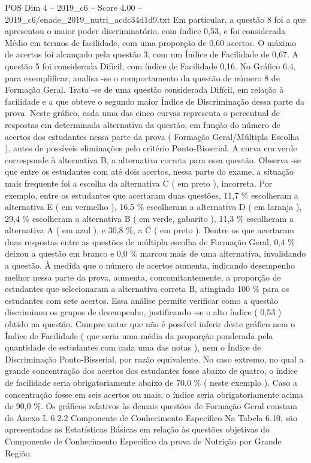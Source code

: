 \begin{textsample}{POS Dim 4 – 2019\_c6 – Score 4.00 – 2019\_c6/enade\_2019\_nutri\_acdc34d1d9.txt}
Em particular, a questão 8 foi a que apresentou o maior poder discriminatório, com índice 0,53, e foi considerada Médio em termos de facilidade, com uma proporção de 0,60 acertos.
O máximo de acertos foi alcançado pela questão 3, com um Índice de Facilidade de 0,67.
A questão 5 foi considerada Difícil, com índice de Facilidade 0,16.
No Gráfico 6.4, para exemplificar, analisa -se o comportamento da questão de número 8 de Formação Geral.
Trata -se de uma questão considerada Difícil, em relação à facilidade e a que obteve o segundo maior Índice de Discriminação dessa parte da prova.
Neste gráfico, cada uma das cinco curvas representa o percentual de respostas em determinada alternativa da questão, em função do número de acertos dos estudantes nessa parte da prova ( Formação Geral/Múltipla Escolha ), antes de possíveis eliminações pelo critério Ponto-Bisserial.
A curva em verde corresponde à alternativa B, a alternativa correta para essa questão.
Observa -se que entre os estudantes com até dois acertos, nessa parte do exame, a situação mais frequente foi a escolha da alternativa C ( em preto ), incorreta.
Por exemplo, entre os estudantes que acertaram duas questões, 11,7 \% escolheram a alternativa E ( em vermelho ), 16,5 \% escolheram a alternativa D ( em laranja ), 29,4 \% escolheram a alternativa B ( em verde, gabarito ), 11,3 \% escolheram a alternativa A ( em azul ), e 30,8 \%, a C ( em preto ).
Dentre os que acertaram duas respostas entre as questões de múltipla escolha de Formação Geral, 0,4 \% deixou a questão em branco e 0,0 \% marcou mais de uma alternativa, invalidando a questão.
À medida que o número de acertos aumenta, indicando desempenho melhor nessa parte da prova, aumenta, concomitantemente, a proporção de estudantes que selecionaram a alternativa correta B, atingindo 100 \% para os estudantes com sete acertos.
Essa análise permite verificar como a questão discriminou os grupos de desempenho, justificando -se o alto índice ( 0,53 ) obtido na questão.
Cumpre notar que não é possível inferir deste gráfico nem o Índice de Facilidade ( que seria uma média da proporção ponderada pela quantidade de estudantes com cada uma das notas ), nem o Índice de Discriminação Ponto-Bisserial, por razão equivalente.
No caso extremo, no qual a grande concentração dos acertos dos estudantes fosse abaixo de quatro, o índice de facilidade seria obrigatoriamente abaixo de 70,0 \% ( neste exemplo ).
Caso a concentração fosse em seis acertos ou mais, o índice seria obrigatoriamente acima de 90,0 \%.
Os gráficos relativos às demais questões de Formação Geral constam do Anexo I. 6.2.2 Componente de Conhecimento Específico Na Tabela 6.10, são apresentadas as Estatísticas Básicas em relação às questões objetivas do Componente de Conhecimento Específico da prova de Nutrição por Grande Região.

\end{textsample}
